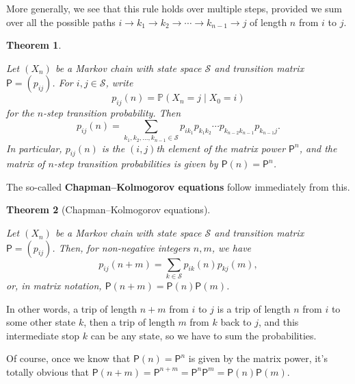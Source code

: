 \documentclass[
  a4paper,
]{article}
\newtheorem{theorem}{Theorem}[section]
\theoremstyle{definition}
\theoremstyle{definition}
\theoremstyle{definition}
\theoremstyle{remark}
\begin{document}
More generally, we see that this rule holds over multiple steps, provided we sum over all the possible paths \(i\to k_1 \to k_2 \to \cdots \to k_{n-1} \to j\) of length \(n\) from \(i\) to \(j\).

\begin{theorem}
\protect\hypertarget{thm:thm-n-step}{}\label{thm:thm-n-step}

Let \((X_n)\) be a Markov chain with state space \(\mathcal S\) and transition matrix \(\mathsf P = (p_{ij})\). For \(i,j \in \mathcal S\), write
\[ p_{ij}(n) = \mathbb P(X_n = j \mid X_0 = i) \]
for the \(n\)-step transition probability. Then
\[ p_{ij}(n) = \sum_{k_1, k_2, \dots, k_{n-1} \in \mathcal S} p_{ik_1} p_{k_1k_2} \cdots p_{k_{n-2}k_{n-1}} p_{k_{n-1}j} . \]
In particular, \(p_{ij}(n)\) is the \((i,j)\)th element of the matrix power \(\mathsf P^n\), and the matrix of \(n\)-step transition probabilities is given by \(\mathsf P(n) = \mathsf P^n\).

\end{theorem}

The so-called \textbf{Chapman--Kolmogorov equations} follow immediately from this.

\begin{theorem}[Chapman–Kolmogorov equations]
\protect\hypertarget{thm:c-k}{}\label{thm:c-k}

Let \((X_n)\) be a Markov chain with state space \(\mathcal S\) and transition matrix \(\mathsf P = (p_{ij})\). Then, for non-negative integers \(n,m\), we have
\[ p_{ij}(n+m) = \sum_{k \in \mathcal S} p_{ik}(n)p_{kj}(m) , \]
or, in matrix notation, \(\mathsf P(n+m) = \mathsf P(n)\mathsf P(m)\).

\end{theorem}

In other words, a trip of length \(n + m\) from \(i\) to \(j\) is a trip of length \(n\) from \(i\) to some other state \(k\), then a trip of length \(m\) from \(k\) back to \(j\), and this intermediate stop \(k\) can be any state, so we have to sum the probabilities.

Of course, once we know that \(\mathsf P(n) = \mathsf P^n\) is given by the matrix power, it's totally obvious that \(\mathsf P(n+m) = \mathsf P^{n+m} = \mathsf P^n \mathsf P^m = \mathsf P(n)\mathsf P(m)\).
\end{document}
